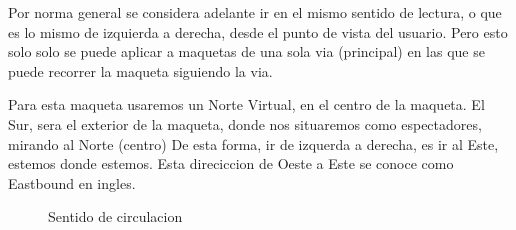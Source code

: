 Por norma general se considera adelante ir en el mismo sentido de lectura, o que es
lo mismo de izquierda a derecha, desde el punto de vista del usuario. Pero esto solo
solo se puede aplicar a maquetas de una sola via (principal) en las que se puede
recorrer la maqueta siguiendo la via.

Para esta maqueta usaremos un Norte Virtual, en el centro de la maqueta. El Sur, sera
el exterior de la maqueta, donde nos situaremos como espectadores, mirando al Norte (centro)
De esta forma, ir de izquerda a derecha, es ir al Este, estemos donde estemos.
Esta direciccion de Oeste a Este se conoce como Eastbound en ingles.

\begin{figure}[H]
    \centering
    
    \caption{Sentido de circulacion}
    \label{fig:Sentidos}
\end{figure}
